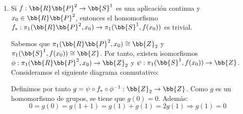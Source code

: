 \documentclass[12pt]{article}
\begin{document}
\begin{ejercicio}[5 puntos]
\begin{enumerate}
            Como $[p \circ \alpha] = [p \circ \beta]$, entonces:
            \begin{equation*}
                (p \circ \alpha)(0) = (p \circ \beta)(0) = p(r_0)
            \end{equation*}

            Por tanto, como los arcos se pueden levantar, si elegimos $\wt{p\circ \alpha}$ y $\wt{p\circ \beta}$ como los levantamientos de $p \circ \alpha$ y $p \circ \beta$ que cumplen $\wt{p\circ \alpha}(0) = \wt{p\circ \beta}(0) = r_0$, entonces:
            \begin{equation*}
                [\wt{p\circ \alpha}] = [\wt{p\circ \beta}] \in \pi_1(R, r_0)
            \end{equation*}

            Por la unicidad de los levantamientos, se tiene que $\wt{p\circ \alpha} = \alpha$ y $\wt{p\circ \beta} = \beta$. Por tanto:
            \begin{equation*}
                [\alpha] = [\beta] \in \pi_1(R, r_0)
            \end{equation*}

            Por tanto, $p_*$ es inyectiva y la afirmación es verdadera.

            \item Si $f: \bb{R}\bb{P}^2 \to \bb{S}^1$ es una aplicación continua y $x_0 \in \bb{R}\bb{P}^2$, entonces el homomorfismo $f_*: \pi_1(\bb{R}\bb{P}^2, x_0) \to \pi_1(\bb{S}^1, f(x_0))$ es trivial.
            
            Sabemos que $\pi_1(\bb{R}\bb{P}^2, x_0) \cong \bb{Z}_2$ y $\pi_1(\bb{S}^1, f(x_0)) \cong \bb{Z}$. Por tanto, existen isomorfismos $\phi: \pi_1(\bb{R}\bb{P}^2, x_0) \to \bb{Z}_2$ y $\psi: \pi_1(\bb{S}^1, f(x_0)) \to \bb{Z}$. Consideramos el siguiente diagrama conmutativo:
            \begin{center}
            \end{center}

            Definimos por tanto $g=\psi \circ f_* \circ \phi^{-1}: \bb{Z}_2 \to \bb{Z}$. Como $g$ es un homomorfismo de grupos, se tiene que $g(0)=0$. Además:
            \begin{equation*}
                0 = g(0) = g(1 + 1) = g(1) + g(1) = 2g(1)\Longrightarrow g(1) = 0
            \end{equation*}


\end{enumerate}
\end{ejercicio}
\end{document}
